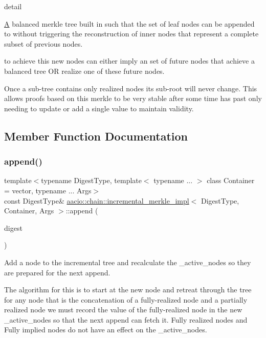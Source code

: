 detail 

\mbox{\hyperlink{struct_a}{A}} balanced merkle tree built in such that the set of leaf nodes can be appended to without triggering the reconstruction of inner nodes that represent a complete subset of previous nodes.

to achieve this new nodes can either imply an set of future nodes that achieve a balanced tree OR realize one of these future nodes.

Once a sub-\/tree contains only realized nodes its sub-\/root will never change. This allows proofs based on this merkle to be very stable after some time has past only needing to update or add a single value to maintain validity. 

\subsection{Member Function Documentation}
\mbox{\label{classaacio_1_1chain_1_1incremental__merkle__impl_a2fd532370b7685284fc118736e228b75}} 
\subsubsection{\texorpdfstring{append()}{append()}}
{\footnotesize\ttfamily template$<$typename Digest\+Type, template$<$ typename ... $>$ class Container = vector, typename ... Args$>$ \\
const Digest\+Type\& \mbox{\hyperlink{classaacio_1_1chain_1_1incremental__merkle__impl}{aacio\+::chain\+::incremental\+\_\+merkle\+\_\+impl}}$<$ Digest\+Type, Container, Args $>$\+::append (\begin{DoxyParamCaption}\item[{const Digest\+Type \&}]{digest }\end{DoxyParamCaption})\hspace{0.3cm}{\ttfamily [inline]}}

Add a node to the incremental tree and recalculate the \+\_\+active\+\_\+nodes so they are prepared for the next append.

The algorithm for this is to start at the new node and retreat through the tree for any node that is the concatenation of a fully-\/realized node and a partially realized node we must record the value of the fully-\/realized node in the new \+\_\+active\+\_\+nodes so that the next append can fetch it. Fully realized nodes and Fully implied nodes do not have an effect on the \+\_\+active\+\_\+nodes.

